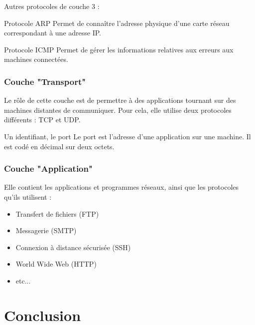 \documentclass{beamer}
\begin{document}
\begin{frame}[allowframebreaks]
    Autres protocoles de couche 3 :
    \begin{block}{Protocole ARP}
        Permet de connaître l'adresse physique d'une carte réseau correspondant à une adresse IP.
    \end{block}
    
    \begin{block}{Protocole ICMP}
        Permet de gérer les informations relatives aux erreurs aux machines connectées.
    \end{block}
    
\end{frame}

\begin{frame}[allowframebreaks]
  \frametitle{Couche "Transport"}

    Le rôle de cette couche est de permettre à des applications tournant sur des machines distantes de communiquer. \newline \newline
    Pour cela, elle utilise deux protocoles différents : TCP et UDP. \newline
    
    \begin{block}{Un identifiant, le port}
        Le port est l'adresse d'une application sur une machine. Il est codé en décimal sur deux octets.
    \end{block}
    
\end{frame}

\begin{frame}[allowframebreaks]
  \frametitle{Couche "Application"}

    Elle contient les applications et programmes réseaux, ainsi que les protocoles qu'ils utilisent :
    \begin{itemize}
        \item Transfert de fichiers (FTP)
        \item Messagerie (SMTP)
        \item Connexion à distance sécurisée (SSH)
        \item World Wide Web (HTTP)
        \item etc...
    \end{itemize}
    
\end{frame}

\section{Conclusion}
\end{document}
